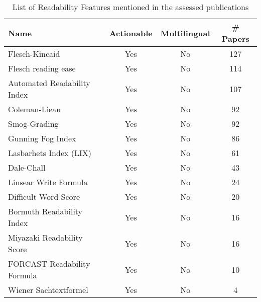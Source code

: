 \begin{table}[htbp]
    \caption{List of Readability Features mentioned in the assessed publications}
    \label{tab:feat_Readability}
    \centering
    \begin{tabular}{m{} c c c}
        \toprule
        \textbf{Name} & \textbf{Actionable} & \textbf{Multilingual} & \textbf{\# Papers} \\ 
        \midrule
        Flesch-Kincaid & Yes & No & 127 \\
        Flesch reading ease & Yes & No & 114 \\
        Automated Readability Index & Yes & No & 107 \\
        Coleman-Lieau & Yes & No & 92 \\
        Smog-Grading & Yes & No & 92 \\
        Gunning Fog Index & Yes & No & 86 \\
        Lasbarhets Index (LIX) & Yes & No & 61 \\
        Dale-Chall & Yes & No & 43 \\
        Linsear Write Formula & Yes & No & 24 \\
        Difficult Word Score & Yes & No & 20 \\
        Bormuth Readability Index & Yes & No & 16 \\
        Miyazaki Readability Score & Yes & No & 16 \\
        FORCAST Readability Formula & Yes & No & 10 \\
        Wiener Sachtextformel & Yes & No & 4 \\
        \bottomrule
    \end{tabular}
\end{table}